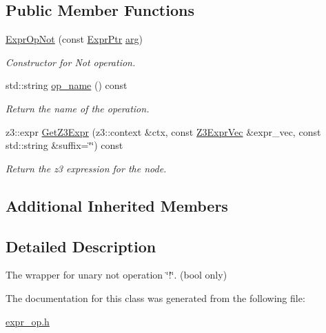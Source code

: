 \subsection*{Public Member Functions}
\begin{DoxyCompactItemize}
\item 
\mbox{\label{classilang_1_1_expr_op_not_a636f589df97c92186ee8b15cea6b3298}} 
\mbox{\hyperlink{classilang_1_1_expr_op_not_a636f589df97c92186ee8b15cea6b3298}{Expr\+Op\+Not}} (const \mbox{\hyperlink{classilang_1_1_expr_a85952b6a34620c4c8cab6bac9c9fdf8c}{Expr\+Ptr}} \mbox{\hyperlink{classilang_1_1_expr_a754c28cd350d28c7bdc8fffe7fe22ec2}{arg}})
\begin{DoxyCompactList}\small\item\em Constructor for Not operation. \end{DoxyCompactList}\item 
\mbox{\label{classilang_1_1_expr_op_not_a719afde38e2b69b5d0ef75544190c9ae}} 
std\+::string \mbox{\hyperlink{classilang_1_1_expr_op_not_a719afde38e2b69b5d0ef75544190c9ae}{op\+\_\+name}} () const
\begin{DoxyCompactList}\small\item\em Return the name of the operation. \end{DoxyCompactList}\item 
\mbox{\label{classilang_1_1_expr_op_not_a780bc51c28f39202444021bed997b841}} 
z3\+::expr \mbox{\hyperlink{classilang_1_1_expr_op_not_a780bc51c28f39202444021bed997b841}{Get\+Z3\+Expr}} (z3\+::context \&ctx, const \mbox{\hyperlink{namespaceilang_adc4eee919aa24fff882d03a48d733c19}{Z3\+Expr\+Vec}} \&expr\+\_\+vec, const std\+::string \&suffix=\char`\"{}\char`\"{}) const
\begin{DoxyCompactList}\small\item\em Return the z3 expression for the node. \end{DoxyCompactList}\end{DoxyCompactItemize}
\subsection*{Additional Inherited Members}


\subsection{Detailed Description}
The wrapper for unary not operation \char`\"{}!\char`\"{}. (bool only) 

The documentation for this class was generated from the following file\+:\begin{DoxyCompactItemize}
\item 
\mbox{\hyperlink{expr__op_8h}{expr\+\_\+op.\+h}}\end{DoxyCompactItemize}
